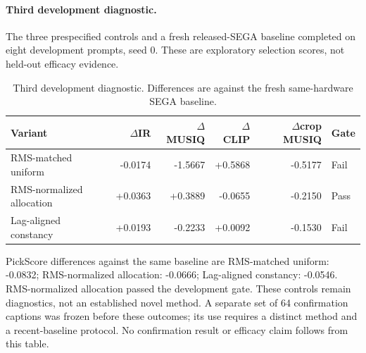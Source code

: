 \paragraph{Third development diagnostic.}
The three prespecified controls and a fresh released-SEGA baseline completed on eight development prompts, seed 0. These are exploratory selection scores, not held-out efficacy evidence.

\begin{table}[ht]
\centering\small
\setlength{\tabcolsep}{4pt}
\caption{Third development diagnostic. Differences are against the fresh same-hardware SEGA baseline.}
\begin{tabular}{@{}lrrrrl@{}}
\toprule
Variant & $\Delta$IR & $\Delta$MUSIQ & $\Delta$CLIP & $\Delta$crop MUSIQ & Gate\\
\midrule
RMS-matched uniform & -0.0174 & -1.5667 & +0.5868 & -0.5177 & Fail\\
RMS-normalized allocation & +0.0363 & +0.3889 & -0.0655 & -0.2150 & Pass\\
Lag-aligned constancy & +0.0193 & -0.2233 & +0.0092 & -0.1530 & Fail\\
\bottomrule
\end{tabular}
\end{table}

PickScore differences against the same baseline are RMS-matched uniform: -0.0832; RMS-normalized allocation: -0.0666; Lag-aligned constancy: -0.0546.
RMS-normalized allocation passed the development gate. These controls remain diagnostics, not an established novel method. A separate set of 64 confirmation captions was frozen before these outcomes; its use requires a distinct method and a recent-baseline protocol. No confirmation result or efficacy claim follows from this table.
